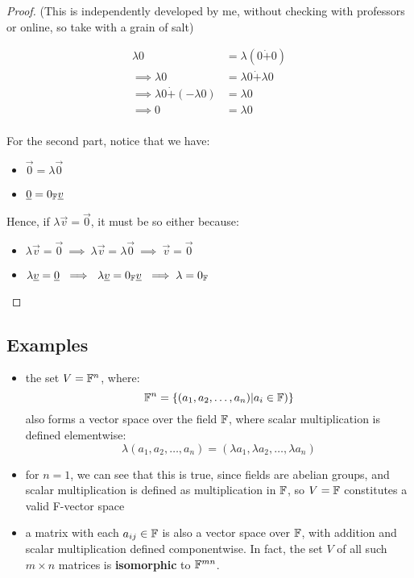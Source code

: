 \documentclass{exam}
\begin{document}
\begin{proof}
(This is independently developed by me, without checking with professors or online, so take with a grain of salt)

\begin{align*}
    \lambda 0 &= \lambda(0 \dot{+} 0) \\
    \implies \lambda 0 &= \lambda 0 \dot{+} \lambda0 \\
    \implies \lambda 0 \dot{+} (-\lambda 0) &= \lambda 0 \\
    \implies 0 &= \lambda 0 \\
\end{align*}

For the second part, notice that we have:
\begin{itemize}
    \item $\vec{0} = \lambda \vec{0}$
    \item $\underline{0} = 0_{\mathbb{F}} \underline{v}$
\end{itemize}

Hence, if $\lambda \vec{v} = \vec{0}$, it must be so either because:
\begin{itemize}
    \item $\lambda \vec{v} = \vec{0} \ \implies \ \lambda \vec{v} = \lambda \vec{0} \ \implies \ \vec{v} = \vec{0}$
    \item $\lambda \vec{v} = \vec{0} \ \implies \ \lambda \vec{v} = 0_\F \vec{v} \ \implies \lambda = 0_\F$
\end{itemize}

\end{proof}

\subsection{Examples}

\begin{itemize}
    \item the set $V = \mathbb{F}^n$, where:
    \[
    \mathbb{F}^n = \{(a_1, a_2, \ldots, a_n) | a_i \in \mathbb{F})\}
    \]
    also forms a vector space over the field $\mathbb{F}$, where scalar multiplication is defined elementwise:
    \[
    \lambda (a_1, a_2, \ldots, a_n) = (\lambda a_1, \lambda a_2, \ldots, \lambda a_n)
    \]
    \item for $n = 1$, we can see that this is true, since fields are abelian groups, and scalar multiplication is defined as multiplication in $\mathbb{F}$, so $V = \mathbb{F}$ constitutes a valid F-vector space
    \item a matrix with each $a_{ij} \in \mathbb{F}$ is also a vector space over $\mathbb{F}$, with addition and scalar multiplication defined componentwise. In fact, the set $V$ of all such $m \times n$ matrices is \textbf{isomorphic} to $\mathbb{F}^{mn}$.
\end{itemize}
\end{document}
